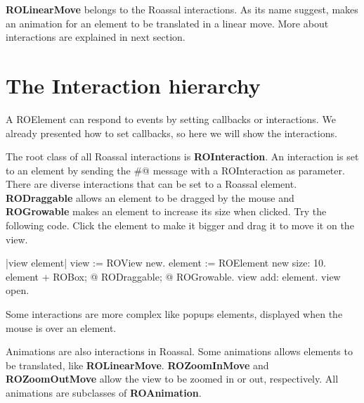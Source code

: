 \documentclass[a4paper,10pt,twoside]{book}
\begin{document}
\textbf{ROLinearMove} belongs to the Roassal interactions. As its name suggest, makes an animation for an element to be translated in a linear move. More about interactions are explained in next section.

%


\section{The Interaction hierarchy} 

A ROElement can respond to events by setting callbacks or interactions. We already presented how to set callbacks, so here we will show the interactions. 

The root class of all Roassal interactions is \textbf{ROInteraction}. An interaction is set to an element by sending the \#@ message with a ROInteraction as parameter.
There are diverse interactions that can be set to a Roassal element.
 \textbf{RODraggable} allows an element to be dragged by the mouse and \textbf{ROGrowable} makes an element to increase its size when clicked. Try the following code. Click the element to make it bigger and drag it to move it on the view.

\begin{code}{}
|view element|
view := ROView new.
element := ROElement new size: 10.
element 
	+ ROBox;
	@ RODraggable; 
	@ ROGrowable.
view add: element.
view open.
\end{code}


Some interactions are more complex like popups elements, displayed when the mouse is over an element. 





Animations are also interactions in Roassal. Some animations allows elements to be translated, like \textbf{ROLinearMove}. \textbf{ROZoomInMove} and \textbf{ROZoomOutMove} allow the view to be zoomed in or out, respectively. All animations are subclasses of \textbf{ROAnimation}.
\end{document}
